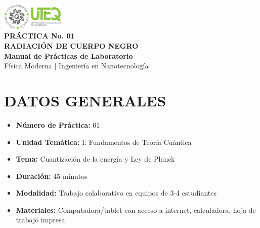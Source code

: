 \documentclass[12pt,a4paper]{article}
\newcommand{\practicenumber}{01}
\newcommand{\practicetitle}{RADIACIÓN DE CUERPO NEGRO}
\newcommand{\practiceunit}{I: Fundamentos de Teoría Cuántica}
\newcommand{\practicesubtopic}{Cuantización de la energía y Ley de Planck}
\begin{document}
	
	
	\begin{center}
		\includegraphics[width=3cm]{../../Imagenes/Logo_uteq}\\[0.3cm]
		
		{\LARGE \textcolor{uteqblue}{\textbf{PRÁCTICA No. \practicenumber}}}\\[0.2cm]
		{\LARGE \textcolor{uteqblue}{\textbf{\practicetitle}}}\\[0.3cm]
		{\large \textcolor{uteqgray}{\textbf{Manual de Prácticas de Laboratorio}}}\\[0.2cm]
		{\normalsize \textcolor{uteqgray}{Física Moderna | Ingeniería en Nanotecnología}}\\[0.5cm]
	\end{center}
	
	\section*{DATOS GENERALES}
	\begin{itemize}
		\item \textbf{Número de Práctica:} \practicenumber
		\item \textbf{Unidad Temática:} \practiceunit
		\item \textbf{Tema:} \practicesubtopic
		\item \textbf{Duración:} 45 minutos
		\item \textbf{Modalidad:} Trabajo colaborativo en equipos de 3-4 estudiantes
		\item \textbf{Materiales:} Computadora/tablet con acceso a internet, calculadora, hoja de trabajo impresa
	\end{itemize}

	
	
	
\end{document}
